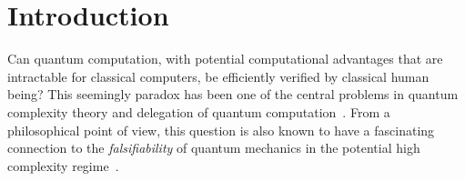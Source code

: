 \section{Introduction}
Can quantum computation, with potential computational advantages that are intractable for classical computers,
be efficiently verified by classical human being? 
This seemingly paradox has been one of the central problems in quantum complexity theory and delegation of quantum computation~\cite{web:Aaronson}. 
From a philosophical point of view, this question is also known to have a fascinating connection to the \emph{falsifiability} of quantum mechanics in the potential high complexity regime~\cite{survey:AV12}. 


